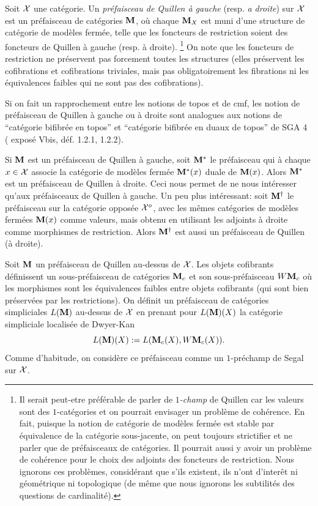 \documentclass[12pt]{article}
\newcommand{\mm}{{\bf M}}
\newcommand{\Xx}{{\cal X}}
\begin{document}
Soit $\Xx$ une cat\'egorie. Un {\em pr\'efaisceau de
Quillen \`a gauche} (resp. {\em a droite}) sur $\Xx$ est un pr\'efaisceau
de cat\'egories
${\bf M}$, o\`u chaque ${\bf M}_X$ est muni d'une structure de cat\'egorie de
mod\`eles ferm\'ee, telle que les foncteurs de restriction soient des
foncteurs de
Quillen \`a gauche (resp. \`a droite).
\footnote{
Il serait peut-etre pr\'ef\'erable de parler de {\em
$1$-champ} de Quillen car les valeurs sont des $1$-cat\'egories et on pourrait
envisager un probl\`eme de coh\'erence. En fait, puisque la notion de
cat\'egorie
de mod\`eles ferm\'ee est stable par \'equivalence de la cat\'egorie
sous-jacente, on peut toujours strictifier et ne parler que de pr\'efaisceaux de
cat\'egories.  Il pourrait aussi y avoir un probl\`eme de coh\'erence pour le
choix des adjoints des foncteurs de restriction. Nous ignorons ces probl\`emes,
consid\'erant que s'ils existent, ils n'ont d'inter\^et ni g\'eom\'etrique ni
topologique (de m\^eme que nous ignorons les subtilit\'es des questions de
cardinalit\'e).}
On note que les foncteurs de restriction ne pr\'eservent pas forcement
toutes les
structures (elles pr\'eservent les cofibrations et cofibrations triviales,
mais pas obligatoirement
les fibrations ni les \'equivalences faibles qui ne sont pas des cofibrations).

Si on fait un rapprochement entre les notions de topos et de cmf, les
notion de pr\'efaisceau de
Quillen \`a gauche ou \`a droite sont analogues aux notions de
``cat\'egorie bifibr\'ee en topos''
et ``cat\'egorie bifibr\'ee en duaux de topos'' de SGA 4 (\cite{SGA4b}
expos\'e Vbis, d\'ef. 1.2.1,
1.2.2).

Si ${\bf M}$ est un pr\'efaisceau de Quillen
\`a gauche, soit ${\bf M}^{\ast}$ le pr\'efaisceau qui \`a chaque $x\in \Xx$
associe la cat\'egorie de mod\`eles ferm\'ee ${\bf M}^{\ast}(x)$ duale
de ${\bf M} (x)$. Alors ${\bf M}^{\ast}$ est un pr\'efaisceau de Quillen \`a
droite. Ceci nous permet de ne nous int\'eresser qu'aux pr\'efaisceaux de
Quillen \`a gauche. Un peu plus int\'eressant: soit ${\bf M}^{\dag}$ le
pr\'efaisceau sur la cat\'egorie oppos\'ee $\Xx ^o$, avec les m\^emes
cat\'egories de mod\`eles ferm\'ees ${\bf M}(x)$ comme valeurs, mais obtenu en
utilisant les adjoints \`a droite comme morphismes de restriction.  Alors ${\bf
M}^{\dag}$ est aussi un pr\'efaisceau de Quillen (\`a droite).

Soit ${\bf M}$ un pr\'efaisceau de Quillen au-dessus de
$\Xx$. Les objets cofibrants d\'efinissent
un sous-pr\'efaisceau de cat\'egories ${\bf M}_c$
et son sous-pr\'efaisceau $W{\bf M}_c$ o\`u les morphismes sont les
\'equivalences faibles entre objets cofibrants (qui sont bien
pr\'eserv\'ees par
les restrictions). On d\'efinit un
pr\'efaisceau de cat\'egories simpliciales $L({\bf M})$ au-dessus de
$\Xx$
en prenant pour
$
L({\bf M})(X)$
la cat\'egorie simpliciale localis\'ee de Dwyer-Kan
$$
L(\mm )(X):= L({\bf M}_c(X), W{\bf M}_c(X)).
$$
Comme d'habitude, on consid\`ere ce
pr\'efaisceau  comme un $1$-pr\'echamp de Segal sur $\Xx$.
\end{document}
